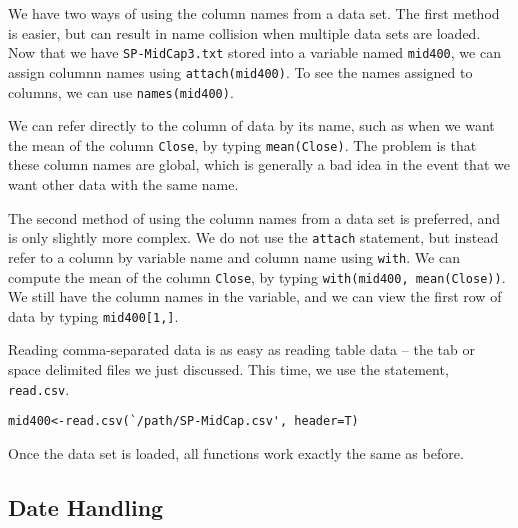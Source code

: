 \pagebreak
We have two ways of using the column names from a data set. The first method is easier, but can result in name collision when multiple data sets are loaded.
\marginpar{\begin{small}\begin{flushleft}\textcolor{blue}{Name collision is the result of two processes or data sets using the same name.}\end{flushleft}\end{small}}
Now that we have \texttt{SP-MidCap3.txt} stored into a variable named \texttt{mid400}, we can assign columnn names using \texttt{attach(mid400)}.
To see the names assigned to columns, we can use \texttt{names(mid400)}.

We can refer directly to the column of data by its name, such as when we want the mean of the column \texttt{Close}, by typing \texttt{mean(Close)}. The problem is that these column names are global, which is generally a bad idea in the event that we want other data with the same name.

The second method of using the column names from a data set is preferred, and is only slightly more complex.  We do not use the \texttt{attach} statement, but instead refer to a column by variable name and column name using \texttt{with}. We can compute the mean of the column \texttt{Close}, by typing \texttt{with(mid400, mean(Close))}.
We still have the column names in the variable, and we can view the first row of data by typing \texttt{mid400[1,]}.

Reading comma-separated data is as easy as reading table data -- the tab or space delimited files we just discussed. This time, we use the statement, 
\texttt{read.csv}.
\begin{verbatim}
mid400<-read.csv(`/path/SP-MidCap.csv', header=T)
\end{verbatim}
Once the data set is loaded, all functions work exactly the same as before.

\subsection{Date Handling}\label{date-handling}
